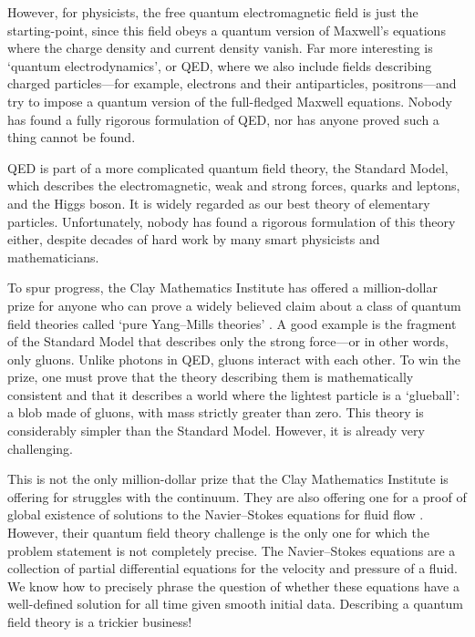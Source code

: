 \documentclass{article}
\begin{document}
However, for physicists, the free quantum electromagnetic field is just the starting-point, since this field obeys a quantum version of Maxwell's equations where the charge density and current density vanish.   Far more interesting is `quantum electrodynamics', or QED, where we also include fields describing charged particles---for example, electrons and their antiparticles,  positrons---and try to impose a quantum version of the full-fledged Maxwell equations. Nobody has found a fully rigorous formulation of QED, nor has anyone proved such a thing cannot be found.

QED is part of a more complicated quantum field theory, the Standard Model, which describes the electromagnetic, weak and strong forces, quarks and leptons, and the Higgs boson.  It is widely regarded as our best theory of elementary particles.  Unfortunately, nobody has found a rigorous formulation of this theory either, despite decades of hard work by many smart physicists and mathematicians.

To spur progress, the Clay Mathematics Institute has offered a million-dollar prize for anyone who can prove a widely believed claim about a class of quantum field theories called `pure Yang--Mills theories' \cite{ClayYM}.  A good example is the fragment of the Standard Model that describes only the strong force---or in other words, only gluons.  Unlike photons in QED, gluons interact with each other.  To win the prize, one must prove that the theory describing them is mathematically consistent and that it describes a world where the lightest particle is a `glueball': a blob made of gluons, with mass strictly greater than zero.  This theory is considerably simpler than the Standard Model.  However, it is already very challenging.

This is not the only million-dollar prize that the Clay Mathematics Institute is offering for struggles with the continuum.  They are also offering one for a proof of global existence of solutions to the Navier--Stokes equations for fluid flow \cite{ClayNS}.  However, their quantum field theory challenge is the only one for which the problem statement is not completely precise.  The Navier--Stokes equations are a collection of partial differential equations for the velocity and pressure of a fluid.  We know how to precisely phrase the question of whether these equations have a well-defined solution for all time given smooth initial data.  Describing a quantum field theory is a trickier business!
\end{document}
